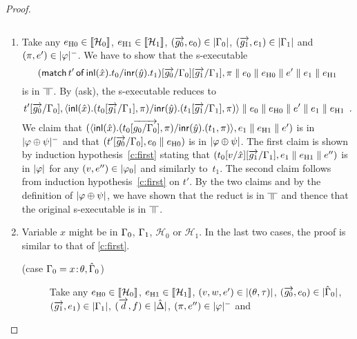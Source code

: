 \begin{proof}
\begin{description}
\[       \]
       \begin{enumerate}[label=\textit{(\arabic{*})}]
        \item Take any
	      $e_{\mathrm{H0}}\in\llbracket{\mathcal H_0}\rrbracket$,
	      $e_{\mathrm{H1}}\in\llbracket{\mathcal H_1}\rrbracket$,
	      $(\overrightarrow{g_0},{e_0})\in|{\Gamma_0}|$,\quad
              $(\overrightarrow{g_1},{e_1})\in|{\Gamma_1}|$
              and
              $(\pi,e')\in|{\varphi}|^-$.
              We have to show that the s-executable
              \[
              (\mathsf{match}\,{t'}\,\mathsf{of}\, \mathsf{inl}({\hat{x}}). {t_0}/ \mathsf{inr}({\hat{y}}). {t_1})[\overrightarrow{ g_0}/\Gamma_0][\overrightarrow{g_1}/\Gamma_1],
              \pi\parallel {e_0\parallel e_{\mathrm{H0}}}\parallel e'\parallel {e_1\parallel e_{\mathrm{H1}}}
              \]
              is in $\bbot$.
              By (ask), the s-executable reduces to
              \[
               t'[\overrightarrow{g_0}/\Gamma_0],
              \langle \mathsf{inl}({\hat{x}}). ({t_0[\overrightarrow{g_1}/\Gamma_1]},{\pi})/ \mathsf{inr}({\hat{y}}). ({t_1[\overrightarrow{g_1}/\Gamma_1]},{\pi})\rangle\parallel{e_0\parallel e_{\mathrm{H0}}\parallel e'}\parallel
              {e_1\parallel e_{\mathrm{H1}}}\enspace.
              \]
              We claim that
              $(\langle \mathsf{inl}({\hat{x}}). ({t_0[\overrightarrow{g_0/\Gamma_0}]},{\pi})/ \mathsf{inr}({\hat{y}}). ({t_1},{\pi})\rangle,{e_1\parallel
              e_{\mathrm{H1}}}\parallel
              e')$ is in $|{\varphi\oplus\psi}|^-$ and that
              $(t'[\overrightarrow{g_0}/\Gamma_0],{e_0\parallel e_{\mathrm{H0}}})$ is in $|{\varphi\oplus\psi}|$.  The first
              claim is shown by induction hypothesis~\ref{c:first}
              stating that $(t_0[v/\hat{x}][\overrightarrow{g_1}/\Gamma_1], {e_1\parallel e_{\mathrm{H1}}}\parallel
              e'')$ is in $|{\varphi}|$ for any $(v,e'')\in|{\varphi_0}|$
              and similarly to~$t_1$.
              The second claim follows from induction
              hypothesis~\ref{c:first} on $t'$.
              By the two claims and by the definition of
              $|{\varphi\oplus\psi}|$,
              we have shown that the reduct is in $\bbot$ and
              thence that the original s-executable is in $\bbot$.
        \item Variable $x$ might be in $\Gamma_0$, $\Gamma_1$,
	       $\mathcal H_0$ or $\mathcal H_1$.
	       In the last two cases, the proof is similar to that of
	       \ref{c:first}.
              \begin{description}
               \item[(case $\Gamma_0 = {x} \mathord{\colon\kern -2pt}{\theta},\hat{\Gamma}_0$)]
                    Take any
		    $e_{\mathrm{H0}}\in\llbracket{\mathcal H_0}\rrbracket$,
		    $e_{\mathrm{H1}}\in\llbracket{\mathcal H_1}\rrbracket$,
                    $(v,w,e')\in|{(\theta,\tau)}|$,
                    $(\overrightarrow{g_0},{e_0})\in|{\hat{\Gamma}_0}|$,
                    $(\overrightarrow{g_1},{e_1})\in|{\Gamma_1}|$,
                    $(\overrightarrow d, f)\in|{\hat{\Delta}}|$,
                    $(\pi,e'')\in|{\varphi}|^-$ and

\end{description}
\end{enumerate}
\end{description}
\end{proof}

